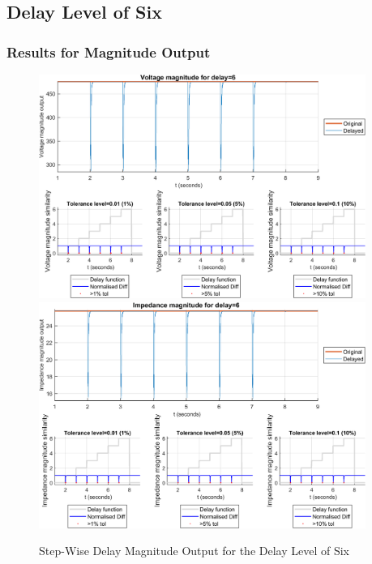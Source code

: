 \subsection{Delay Level of Six}
\subsubsection{Results for Magnitude Output}

\begin{figure}
    \caption{Step-Wise Delay Magnitude Output for the Delay Level of Six}
    \includegraphics[width=0.95\textwidth]{PMUsim-figures/DelayOf_6/Step_vMagnitude.png}    
      \includegraphics[width=0.95\textwidth]{PMUsim-figures/DelayOf_6/Step_iMagnitude.png}  
    \label{fig:PMUsimStep_Six_Magnitude}
    \begin{small}
     \end{small}

\end{figure}

